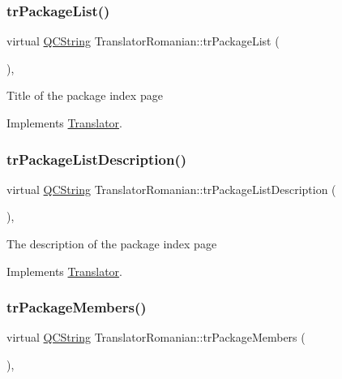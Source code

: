 \subsubsection{\texorpdfstring{trPackageList()}{trPackageList()}}
{\footnotesize\ttfamily virtual \mbox{\hyperlink{class_q_c_string}{Q\+C\+String}} Translator\+Romanian\+::tr\+Package\+List (\begin{DoxyParamCaption}{ }\end{DoxyParamCaption})\hspace{0.3cm}{\ttfamily [inline]}, {\ttfamily [virtual]}}

Title of the package index page 

Implements \mbox{\hyperlink{class_translator}{Translator}}.

\mbox{\label{class_translator_romanian_aba3b3478465593d6053306a2d6f5e816}} 
\subsubsection{\texorpdfstring{trPackageListDescription()}{trPackageListDescription()}}
{\footnotesize\ttfamily virtual \mbox{\hyperlink{class_q_c_string}{Q\+C\+String}} Translator\+Romanian\+::tr\+Package\+List\+Description (\begin{DoxyParamCaption}{ }\end{DoxyParamCaption})\hspace{0.3cm}{\ttfamily [inline]}, {\ttfamily [virtual]}}

The description of the package index page 

Implements \mbox{\hyperlink{class_translator}{Translator}}.

\mbox{\label{class_translator_romanian_a295370132952a148707f3ec631af07cb}} 
\subsubsection{\texorpdfstring{trPackageMembers()}{trPackageMembers()}}
{\footnotesize\ttfamily virtual \mbox{\hyperlink{class_q_c_string}{Q\+C\+String}} Translator\+Romanian\+::tr\+Package\+Members (\begin{DoxyParamCaption}{ }\end{DoxyParamCaption})\hspace{0.3cm}{\ttfamily [inline]}, {\ttfamily [virtual]}}

